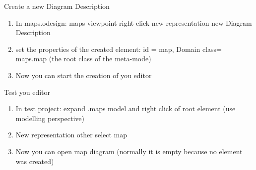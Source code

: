\begin{frame}{Create a new Diagram Description}


	\begin{enumerate}
		\item In maps.odesign: maps viewpoint right click \ra new representation \ra new Diagram Description
		\item set the properties of the created element: id = map, Domain class= maps.map (the root class of the meta-mode)
		\item Now you can start the creation of you editor
	\end{enumerate}

\end{frame}

\begin{frame}{Test you editor}


	\begin{enumerate}
		\item In test project: expand .maps model and right click of root element (use modelling perspective)
		\item New representation \ra other \ra select map
		\item Now you can open map diagram (normally it is empty because no element was created)
	\end{enumerate}

\end{frame}

